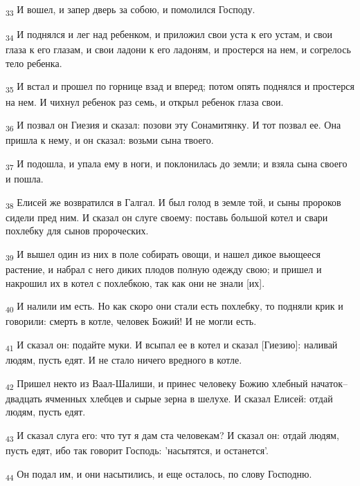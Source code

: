 \begin{tcolorbox}
\textsubscript{33} И вошел, и запер дверь за собою, и помолился Господу.
\end{tcolorbox}
\begin{tcolorbox}
\textsubscript{34} И поднялся и лег над ребенком, и приложил свои уста к его устам, и свои глаза к его глазам, и свои ладони к его ладоням, и простерся на нем, и согрелось тело ребенка.
\end{tcolorbox}
\begin{tcolorbox}
\textsubscript{35} И встал и прошел по горнице взад и вперед; потом опять поднялся и простерся на нем. И чихнул ребенок раз семь, и открыл ребенок глаза свои.
\end{tcolorbox}
\begin{tcolorbox}
\textsubscript{36} И позвал он Гиезия и сказал: позови эту Сонамитянку. И тот позвал ее. Она пришла к нему, и он сказал: возьми сына твоего.
\end{tcolorbox}
\begin{tcolorbox}
\textsubscript{37} И подошла, и упала ему в ноги, и поклонилась до земли; и взяла сына своего и пошла.
\end{tcolorbox}
\begin{tcolorbox}
\textsubscript{38} Елисей же возвратился в Галгал. И был голод в земле той, и сыны пророков сидели пред ним. И сказал он слуге своему: поставь большой котел и свари похлебку для сынов пророческих.
\end{tcolorbox}
\begin{tcolorbox}
\textsubscript{39} И вышел один из них в поле собирать овощи, и нашел дикое вьющееся растение, и набрал с него диких плодов полную одежду свою; и пришел и накрошил их в котел с похлебкою, так как они не знали [их].
\end{tcolorbox}
\begin{tcolorbox}
\textsubscript{40} И налили им есть. Но как скоро они стали есть похлебку, то подняли крик и говорили: смерть в котле, человек Божий! И не могли есть.
\end{tcolorbox}
\begin{tcolorbox}
\textsubscript{41} И сказал он: подайте муки. И всыпал ее в котел и сказал [Гиезию]: наливай людям, пусть едят. И не стало ничего вредного в котле.
\end{tcolorbox}
\begin{tcolorbox}
\textsubscript{42} Пришел некто из Ваал-Шалиши, и принес человеку Божию хлебный начаток--двадцать ячменных хлебцев и сырые зерна в шелухе. И сказал Елисей: отдай людям, пусть едят.
\end{tcolorbox}
\begin{tcolorbox}
\textsubscript{43} И сказал слуга его: что тут я дам ста человекам? И сказал он: отдай людям, пусть едят, ибо так говорит Господь: 'насытятся, и останется'.
\end{tcolorbox}
\begin{tcolorbox}
\textsubscript{44} Он подал им, и они насытились, и еще осталось, по слову Господню.
\end{tcolorbox}
